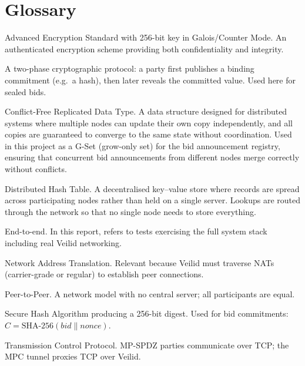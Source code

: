 \section*{Glossary}

\begin{description}[style=nextline, labelwidth=5cm, leftmargin=5.5cm]

  \item[AES-256-GCM] Advanced Encryption Standard with 256-bit key in Galois/Counter Mode. An authenticated encryption scheme providing both confidentiality and integrity.
  \item[Commitment scheme] A two-phase cryptographic protocol: a party first publishes a binding commitment (e.g.\ a hash), then later reveals the committed value. Used here for sealed bids.
  \item[CRDT] Conflict-Free Replicated Data Type. A data structure designed for distributed systems where multiple nodes can update their own copy independently, and all copies are guaranteed to converge to the same state without coordination. Used in this project as a G-Set (grow-only set) for the bid announcement registry, ensuring that concurrent bid announcements from different nodes merge correctly without conflicts.
  \item[DHT] Distributed Hash Table. A decentralised key--value store where records are spread across participating nodes rather than held on a single server. Lookups are routed through the network so that no single node needs to store everything.
  \item[E2E] End-to-end. In this report, refers to tests exercising the full system stack including real Veilid networking.
  \item[NAT] Network Address Translation. Relevant because Veilid must traverse NATs (carrier-grade or regular) to establish peer connections.
  \item[P2P] Peer-to-Peer. A network model with no central server; all participants are equal.
  \item[SHA-256] Secure Hash Algorithm producing a 256-bit digest. Used for bid commitments: $C = \text{SHA-256}(\mathit{bid} \| \mathit{nonce})$.
  \item[TCP] Transmission Control Protocol. MP-SPDZ parties communicate over TCP; the MPC tunnel proxies TCP over Veilid.


\end{description}
